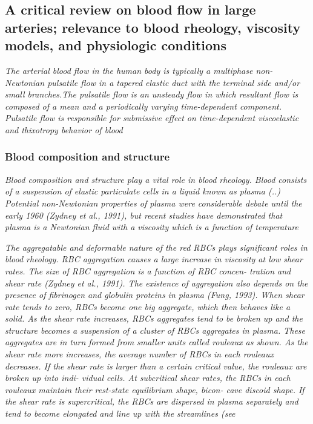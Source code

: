 \documentclass[11pt,letterpaper]{article}
\begin{document}
\newpage
\subsection{A critical review on blood  flow in large  arteries; relevance to blood rheology, viscosity models,  and physiologic  conditions}


\textit{The  arterial blood flow in  the human body is typically  a
multiphase non-Newtonian pulsatile flow in a  tapered elastic duct with the terminal side and/or small  branches.The pulsatile flow is an unsteady  flow  in which resultant flow is  composed  of  a mean and  a periodically varying time-dependent component. Pulsatile flow  is responsible  for submissive effect  on  time-dependent viscoelastic and thixotropy behavior of  blood}


\subsubsection*{Blood composition and  structure}\textit{Blood composition  and structure play a vital role in blood  rheology. Blood consists of a suspension of  elastic particulate cells  in  a liquid known as plasma (..) Potential non-Newtonian properties of plasma  were considerable debate until the early 1960 (Zydney  et al., 1991), but  recent  studies have demonstrated  that plasma is  a Newtonian  fluid with  a viscosity which is a  function of temperature}

\textit{The aggregatable and  deformable nature of the red RBCs
plays significant roles in blood rheology. RBC aggregation causes a large increase in  viscosity at low shear rates. The size of RBC aggregation is a  function  of  RBC  concen- tration and shear rate (Zydney  et al., 1991).  The existence of aggregation also depends  on  the presence of fibrinogen and  globulin proteins in plasma (Fung,  1993). When  shear rate tends to  zero,  RBCs become  one big aggregate,  which then  behaves like  a solid. As  the shear  rate increases, RBCs aggregates  tend to be  broken  up and the  structure becomes a suspension of a  cluster of  RBCs aggregates in  plasma. These aggregates are  in turn formed  from smaller  units called rouleaux as shown. As the shear rate more  increases,  the average number of  RBCs  in each rouleaux  decreases. If the shear rate is larger than a certain  critical value,  the rouleaux are  broken up  into indi- vidual cells. At subcritical shear rates, the  RBCs  in each rouleaux maintain  their rest-state equilibrium  shape, bicon- cave discoid shape.  If the  shear rate is  supercritical, the RBCs  are dispersed in plasma separately  and tend to become  elongated  and line up with the streamlines  (see}
\end{document}
